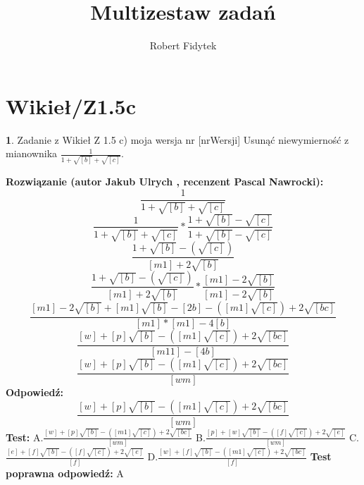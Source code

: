 \documentclass[12pt, a4paper]{article}
\title{Multizestaw zadań}
\author{Robert Fidytek}
\date{}
\theoremstyle{definition} %
\newtheorem{zad}{}
\newcommand{\kategoria}[1]{\section{#1}} %
\newcommand{\zadStart}[1]{\begin{zad}#1\newline} %
\newcommand{\zadStop}{\end{zad}}   %
\newcommand{\rozwStart}[2]{\noindent \textbf{Rozwiązanie (autor #1 , recenzent #2): }\newline} %
\newcommand{\rozwStop}{\newline}                                            %
\newcommand{\odpStart}{\noindent \textbf{Odpowiedź:}\newline}    %
\newcommand{\odpStop}{\newline}                                             %
\newcommand{\testStart}{\noindent \textbf{Test:}\newline} %
\newcommand{\testStop}{\newline} %
\newcommand{\kluczStart}{\noindent \textbf{Test poprawna odpowiedź:}\newline} %
\newcommand{\kluczStop}{\newline} %
\begin{document}
\maketitle


\kategoria{Wikieł/Z1.5c}
\zadStart{Zadanie z Wikieł Z 1.5 c) moja wersja nr [nrWersji]}
Usunąć niewymierność z mianownika $\frac{1}{1+\sqrt{[b]}+\sqrt{[c]}}$.
\zadStop
\rozwStart{Jakub Ulrych}{Pascal Nawrocki}
$$\frac{1}{1+\sqrt{[b]}+\sqrt{[c]}}$$
$$\frac{1}{1+\sqrt{[b]}+\sqrt{[c]}}*\frac{1+\sqrt{[b]}-\sqrt{[c]}}{1+\sqrt{[b]}-\sqrt{[c]}}$$
$$\frac{1+\sqrt{[b]}-(\sqrt{[c]})}{[m1]+2\sqrt{[b]}}$$
$$\frac{1+\sqrt{[b]}-(\sqrt{[c]})}{[m1]+2\sqrt{[b]}}*\frac{[m1]-2\sqrt{[b]}}{[m1]-2\sqrt{[b]}}$$
$$\frac{[m1]-2\sqrt{[b]}+[m1]\sqrt{[b]}-[2b]-([m1]\sqrt{[c]})+2\sqrt{[bc]}}{[m1]*[m1]-4[b]}$$
$$\frac{[w]+[p]\sqrt{[b]}-([m1]\sqrt{[c]})+2\sqrt{[bc]}}{[m11]-[4b]}$$
$$\frac{[w]+[p]\sqrt{[b]}-([m1]\sqrt{[c]})+2\sqrt{[bc]}}{[wm]}$$
\rozwStop
\odpStart
$$\frac{[w]+[p]\sqrt{[b]}-([m1]\sqrt{[c]})+2\sqrt{[bc]}}{[wm]}$$
\odpStop
\testStart
A.$\frac{[w]+[p]\sqrt{[b]}-([m1]\sqrt{[c]})+2\sqrt{[bc]}}{[wm]}$
B.$\frac{[p]+[w]\sqrt{[b]}-([f]\sqrt{[c]})+2\sqrt{[e]}}{[wm]}$
C.$\frac{[e]+[f]\sqrt{[b]}-([f]\sqrt{[c]})+2\sqrt{[e]}}{[f]}$
D.$\frac{[w]+[f]\sqrt{[b]}-([m1]\sqrt{[c]})+2\sqrt{[bc]}}{[f]}$
\testStop
\kluczStart
A
\kluczStop
\end{document}

